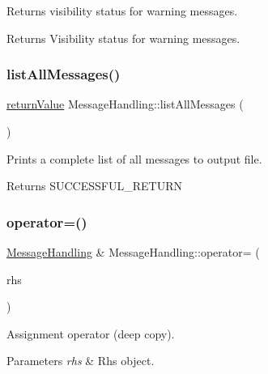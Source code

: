 Returns visibility status for warning messages. \begin{DoxyReturn}{Returns}
Visibility status for warning messages. 
\end{DoxyReturn}
\mbox{\label{class_message_handling_a8b6ff3603352ace1322188f156983c44}} 
\subsubsection{\texorpdfstring{list\+All\+Messages()}{listAllMessages()}}
{\footnotesize\ttfamily \hyperlink{_message_handling_8hpp_a81d556f613bfbabd0b1f9488c0fa865e}{return\+Value} Message\+Handling\+::list\+All\+Messages (\begin{DoxyParamCaption}{ }\end{DoxyParamCaption})}

Prints a complete list of all messages to output file. \begin{DoxyReturn}{Returns}
S\+U\+C\+C\+E\+S\+S\+F\+U\+L\+\_\+\+R\+E\+T\+U\+RN 
\end{DoxyReturn}
\mbox{\label{class_message_handling_a5bdc56ea0f2ba7d70b9c47a3403692a1}} 
\subsubsection{\texorpdfstring{operator=()}{operator=()}}
{\footnotesize\ttfamily \hyperlink{class_message_handling}{Message\+Handling} \& Message\+Handling\+::operator= (\begin{DoxyParamCaption}\item[{const \hyperlink{class_message_handling}{Message\+Handling} \&}]{rhs }\end{DoxyParamCaption})}

Assignment operator (deep copy). 
\begin{DoxyParams}{Parameters}
{\em rhs} & Rhs object. \\
\hline
\end{DoxyParams}
\mbox{\label{class_message_handling_aee146336fc1d08ae20ea00498aee471f}} 

